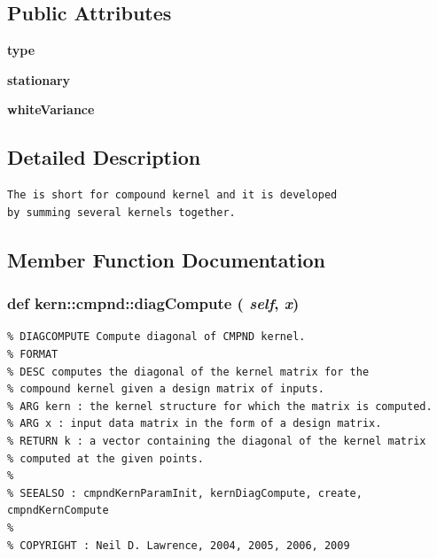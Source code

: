 \subsection*{Public Attributes}
\begin{CompactItemize}
\item 
\hypertarget{classkern_1_1cmpnd_c9b5eb3435c417c472cadb0644eb3fbc}{
\textbf{type}}
\label{classkern_1_1cmpnd_c9b5eb3435c417c472cadb0644eb3fbc}

\item 
\hypertarget{classkern_1_1cmpnd_18f301cebf729f9c905ba52e0ab1c3f1}{
\textbf{stationary}}
\label{classkern_1_1cmpnd_18f301cebf729f9c905ba52e0ab1c3f1}

\item 
\hypertarget{classkern_1_1cmpnd_c470399a334eada7a278bc914e39ddd3}{
\textbf{whiteVariance}}
\label{classkern_1_1cmpnd_c470399a334eada7a278bc914e39ddd3}

\end{CompactItemize}


\subsection{Detailed Description}


\footnotesize\begin{verbatim}The is short for compound kernel and it is developed
by summing several kernels together.\end{verbatim}
\normalsize
 

\subsection{Member Function Documentation}
\hypertarget{classkern_1_1cmpnd_5852fb0a16565b8a888c5b32399a0abd}{
\subsubsection[{diagCompute}]{\setlength{\rightskip}{0pt plus 5cm}def kern::cmpnd::diagCompute ( {\em self}, \/   {\em x})}}
\label{classkern_1_1cmpnd_5852fb0a16565b8a888c5b32399a0abd}




\footnotesize\begin{verbatim}% DIAGCOMPUTE Compute diagonal of CMPND kernel.
% FORMAT
% DESC computes the diagonal of the kernel matrix for the
% compound kernel given a design matrix of inputs.
% ARG kern : the kernel structure for which the matrix is computed.
% ARG x : input data matrix in the form of a design matrix.
% RETURN k : a vector containing the diagonal of the kernel matrix
% computed at the given points.
%
% SEEALSO : cmpndKernParamInit, kernDiagCompute, create, cmpndKernCompute
%
% COPYRIGHT : Neil D. Lawrence, 2004, 2005, 2006, 2009

\end{verbatim}
\normalsize
 

